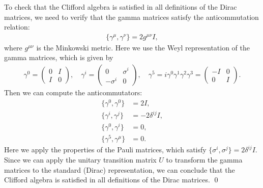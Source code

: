 To check that the Clifford algebra is satisfied in all definitions of the Dirac matrices, we need to verify that the gamma matrices satisfy the anticommutation relation:
\begin{align}
    \{\gamma^\mu, \gamma^\nu\} = 2g^{\mu\nu}I,
\end{align}
where $g^{\mu\nu}$ is the Minkowski metric. Here we use the Weyl representation of the gamma matrices, which is given by
\begin{align}
    \gamma^0 = \begin{pmatrix}
        0 & I \\
        I & 0
    \end{pmatrix}, \quad
    \gamma^i = \begin{pmatrix}
        0 & \sigma^i \\
        -\sigma^i & 0
    \end{pmatrix}, \quad
    \gamma^5 = i\gamma^0\gamma^1\gamma^2\gamma^3 = \begin{pmatrix}
        -I & 0 \\
        0 & I
    \end{pmatrix}.
\end{align}
Then we can compute the anticommutators:
\begin{align}
    \{\gamma^0, \gamma^0\} &= 2I, \\
    \{\gamma^i, \gamma^j\} &= -2\delta^{ij}I, \\
    \{\gamma^0, \gamma^i\} &= 0, \\
    \{\gamma^5, \gamma^\mu\} &= 0.
\end{align}
Here we apply the properties of the Pauli matrices, which satisfy $\{\sigma^i, \sigma^j\} = 2\delta^{ij}I$. Since we can apply the unitary transition matrix $U$ to transform the gamma matrices to the standard (Dirac) representation, we can conclude that the Clifford algebra is satisfied in all definitions of the Dirac matrices.
\qed